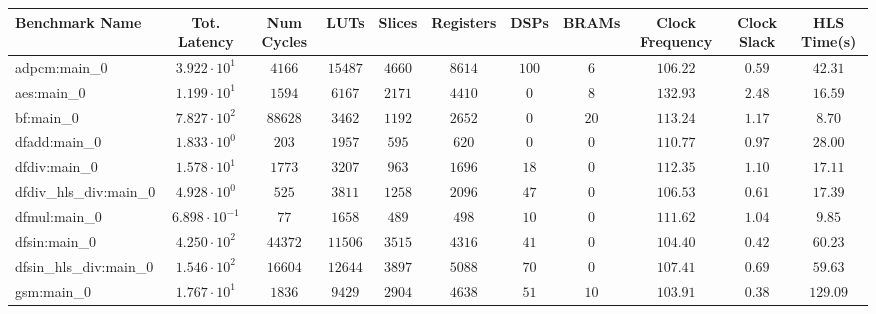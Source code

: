 \begin{tabular}{|l|c|c|c|c|c|c|c|c|c|c|}
\hline
Benchmark Name          & Tot. Latency            & Num Cycles & LUTs      & Slices    & Registers & DSPs    & BRAMs   & Clock Frequency & Clock Slack & HLS Time(s) \\
\hline
adpcm:main\_0           & $ 3.922 \cdot 10^{1}  $ & $ 4166   $ & $ 15487 $ & $ 4660  $ & $ 8614  $ & $ 100 $ & $ 6   $ & $ 106.22      $ & $ 0.59    $ & $ 42.31   $ \\
aes:main\_0             & $ 1.199 \cdot 10^{1}  $ & $ 1594   $ & $ 6167  $ & $ 2171  $ & $ 4410  $ & $ 0   $ & $ 8   $ & $ 132.93      $ & $ 2.48    $ & $ 16.59   $ \\
bf:main\_0              & $ 7.827 \cdot 10^{2}  $ & $ 88628  $ & $ 3462  $ & $ 1192  $ & $ 2652  $ & $ 0   $ & $ 20  $ & $ 113.24      $ & $ 1.17    $ & $ 8.70    $ \\
dfadd:main\_0           & $ 1.833 \cdot 10^{0}  $ & $ 203    $ & $ 1957  $ & $ 595   $ & $ 620   $ & $ 0   $ & $ 0   $ & $ 110.77      $ & $ 0.97    $ & $ 28.00   $ \\
dfdiv:main\_0           & $ 1.578 \cdot 10^{1}  $ & $ 1773   $ & $ 3207  $ & $ 963   $ & $ 1696  $ & $ 18  $ & $ 0   $ & $ 112.35      $ & $ 1.10    $ & $ 17.11   $ \\
dfdiv\_hls\_div:main\_0 & $ 4.928 \cdot 10^{0}  $ & $ 525    $ & $ 3811  $ & $ 1258  $ & $ 2096  $ & $ 47  $ & $ 0   $ & $ 106.53      $ & $ 0.61    $ & $ 17.39   $ \\
dfmul:main\_0           & $ 6.898 \cdot 10^{-1} $ & $ 77     $ & $ 1658  $ & $ 489   $ & $ 498   $ & $ 10  $ & $ 0   $ & $ 111.62      $ & $ 1.04    $ & $ 9.85    $ \\
dfsin:main\_0           & $ 4.250 \cdot 10^{2}  $ & $ 44372  $ & $ 11506 $ & $ 3515  $ & $ 4316  $ & $ 41  $ & $ 0   $ & $ 104.40      $ & $ 0.42    $ & $ 60.23   $ \\
dfsin\_hls\_div:main\_0 & $ 1.546 \cdot 10^{2}  $ & $ 16604  $ & $ 12644 $ & $ 3897  $ & $ 5088  $ & $ 70  $ & $ 0   $ & $ 107.41      $ & $ 0.69    $ & $ 59.63   $ \\
gsm:main\_0             & $ 1.767 \cdot 10^{1}  $ & $ 1836   $ & $ 9429  $ & $ 2904  $ & $ 4638  $ & $ 51  $ & $ 10  $ & $ 103.91      $ & $ 0.38    $ & $ 129.09  $ \\

\end{tabular}

